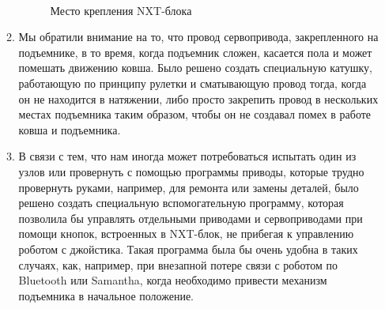 \begin{enumerate}
\begin{enumerate}
		\begin{figure}[H]
			\begin{minipage}[h]{0.2\linewidth}
				\center  
			\end{minipage}
			\begin{minipage}[h]{0.6\linewidth}
				\caption{Место крепления NXT-блока}
			\end{minipage}
		\end{figure}
		
		\item Мы обратили внимание на то, что провод сервопривода, закрепленного на подъемнике, в то время, когда подъемник сложен, касается пола и может помешать движению ковша. Было решено создать специальную катушку, работающую по принципу рулетки и сматывающую провод тогда, когда он не находится в натяжении, либо просто закрепить провод в нескольких местах подъемника таким образом, чтобы он не создавал помех в работе ковша и подъемника.
		
		\item В связи с тем, что нам иногда может потребоваться испытать один из узлов или провернуть с помощью программы приводы, которые трудно провернуть руками, например, для ремонта или замены деталей, было решено создать специальную вспомогательную программу, которая позволила бы управлять отдельными приводами и сервоприводами при помощи кнопок, встроенных в NXT-блок, не прибегая к управлению роботом с джойстика. Такая программа была бы очень удобна в таких случаях, как, например, при внезапной потере связи с роботом по Bluetooth или Samantha, когда необходимо привести механизм подъемника в начальное положение.
		

\end{enumerate}
\end{enumerate}
